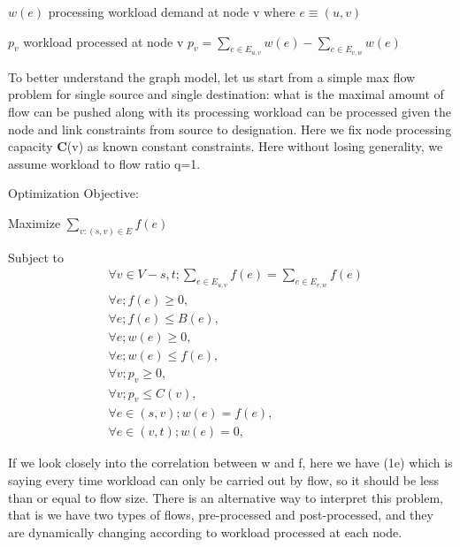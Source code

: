 \documentclass{sig-alternate}
\begin{document}
$ w(e) $ processing workload demand at node v
$\text{where } e \equiv (u,v) $ 

$p_v $   workload processed at node v
$p_v = \sum\limits_{e \in E_{u, v} } w(e) - \sum\limits_{e \in E_{v, w} } w(e)  $ 


To better understand the graph model, let us start from a simple max flow problem for single source and single destination\cite{FordFulkerson, Edmonds1972}: what is the maximal amount of flow can be pushed along with its processing workload can be processed given the node and link constraints from source to designation.
Here we fix node processing capacity \textbf{C}(v) as known constant constraints. Here without losing generality, we assume workload to flow ratio q=1.
\newline



Optimization Objective:
\newline

Maximize $\sum \limits_{v: (s, v) \in E} f(e) $
\newline

Subject to
\newline
\begin{subequations}
\begin{align}
 &\forall v \in V-{s, t}; \sum\limits_{e \in E_{u, v}}  f(e)= \sum\limits_{e \in E_{v, w} } f(e)\\
&\forall e; f(e)\geq 0,\\
&\forall e; f(e)\leq B(e),\\
&\forall e; w(e) \geq 0,\\
&\forall e; w(e) \leq f(e),\\
&\forall v; p_v\geq 0 ,\\
&\forall v; p_v\leq C(v),\\
&\forall e\in(s, v) ; w(e) =f(e),\\
&\forall e\in(v,t) ; w(e) =0, 
\end{align}
\end{subequations}

If we look closely into the correlation between w and f, here we have (1e) which is saying every time workload can only be carried out by flow, so it should be less than or equal to flow size. There is an alternative way to interpret this problem, that is we have two types of flows, pre-processed and post-processed, and  they are dynamically changing according to workload processed at each node. 
\end{document}
